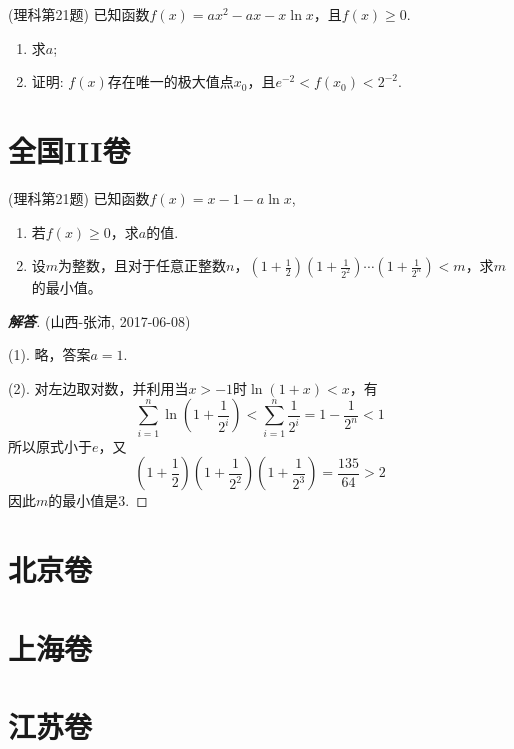 \documentclass{ctexart}
\begin{document}
\begin{exercise}(理科第21题)
  已知函数$f(x)=ax^2-ax-x\ln{x}$，且$f(x) \geqslant 0$.
  \begin{enumerate}
  \item 求$a$;
  \item 证明: $f(x)$存在唯一的极大值点$x_0$，且$e^{-2}<f(x_0)<2^{-2}$.
  \end{enumerate}
\end{exercise}

\section{全国III卷}
\label{sec:nation-3}

\begin{exercise}(理科第21题)
  已知函数$f(x)=x-1-a\ln{x}$,
  \begin{enumerate}
  \item 若$f(x) \geqslant 0$，求$a$的值.
  \item 设$m$为整数，且对于任意正整数$n$，$\left( 1+\frac{1}{2} \right)\left( 1+\frac{1}{2^2} \right) \cdots \left( 1+\frac{1}{2^n} \right) <m$，求$m$的最小值。
  \end{enumerate}
\end{exercise}

\begin{proof}[\textbf{解答}](山西-张沛, 2017-06-08)

  (1). 略，答案$a=1$.

  (2). 对左边取对数，并利用当$x>-1$时$\ln{(1+x)}<x$，有
  \[ \sum_{i=1}^n \ln{\left( 1+\frac{1}{2^i} \right)} < \sum_{i=1}^n \frac{1}{2^i} = 1-\frac{1}{2^n} < 1 \]
  所以原式小于$e$，又
  \[ \left( 1+\frac{1}{2} \right)\left( 1+\frac{1}{2^2} \right)\left( 1+\frac{1}{2^3} \right) = \frac{135}{64}>2 \]
  因此$m$的最小值是3.
\end{proof}

\section{北京卷}
\label{sec:beijing}

\section{上海卷}
\label{sec:shanghai}

\section{江苏卷}
\label{sec:jiangshu}
\end{document}
